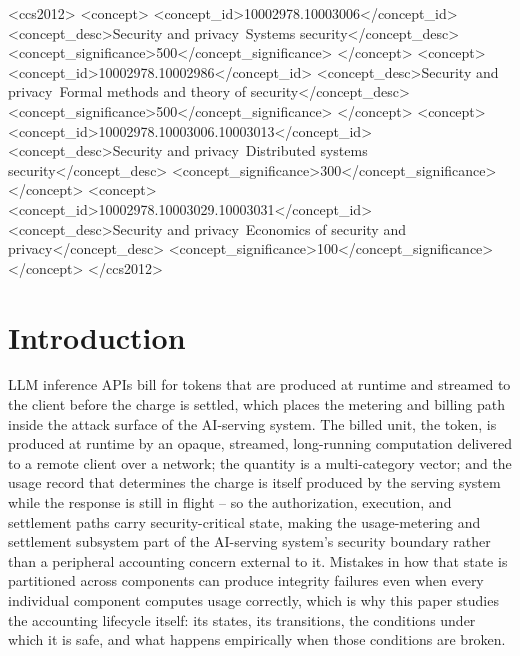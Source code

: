\documentclass[manuscript,review,anonymous]{acmart}
\begin{document}
\begin{CCSXML}
<ccs2012>
<concept>
<concept_id>10002978.10003006</concept_id>
<concept_desc>Security and privacy~Systems security</concept_desc>
<concept_significance>500</concept_significance>
</concept>
<concept>
<concept_id>10002978.10002986</concept_id>
<concept_desc>Security and privacy~Formal methods and theory of security</concept_desc>
<concept_significance>500</concept_significance>
</concept>
<concept>
<concept_id>10002978.10003006.10003013</concept_id>
<concept_desc>Security and privacy~Distributed systems security</concept_desc>
<concept_significance>300</concept_significance>
</concept>
<concept>
<concept_id>10002978.10003029.10003031</concept_id>
<concept_desc>Security and privacy~Economics of security and privacy</concept_desc>
<concept_significance>100</concept_significance>
</concept>
</ccs2012>
\end{CCSXML}



\maketitle

\section{Introduction}
\label{sec:intro}
LLM inference APIs bill for tokens that are produced at runtime and streamed to the
client before the charge is settled, which places the metering and billing path inside
the attack surface of the AI-serving system. The billed unit, the
token, is produced at runtime by an opaque, streamed, long-running computation delivered
to a remote client over a network; the quantity is a multi-category vector; and the
usage record that determines the charge is itself produced by the serving system while
the response is still in flight -- so the authorization, execution, and settlement paths
carry security-critical state, making the usage-metering and settlement
subsystem part of the AI-serving system's security boundary rather than a peripheral
accounting concern external to it. Mistakes in how that state is
partitioned across components can produce integrity failures even when every individual
component computes usage correctly, which is why this paper studies the accounting
lifecycle itself: its states, its transitions, the conditions under which it is safe, and
what happens empirically when those conditions are broken.
\end{document}
